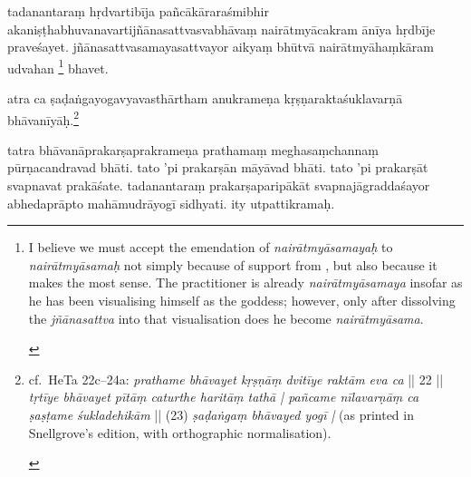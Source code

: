 \documentclass[naipra.tex]{subfiles}
\begin{document}
\begin{sanskrit}
\pstart
tadanantaraṃ hṛdvartibīja pañcākāraraśmibhir akaniṣṭhabhuvanavartijñānasattvasvabhāvaṃ nairātmyācakram ānīya hṛdbīje praveśayet.
jñānasattvasamayasattvayor aikyaṃ bhūtvā nairātmyāhaṃkāram udvahan \footnote{\begin{english}
	I believe we must accept the emendation of \emph{nairātmyāsamayaḥ} to \emph{nairātmyāsamaḥ} not simply because of support from \TIB , but also because it makes the most sense.
	The practitioner is already \emph{nairātmyāsamaya} insofar as he has been visualising himself as the goddess; however, only after dissolving the \emph{jñānasattva} into that visualisation does he become \emph{nairātmyāsama}.
\end{english}} bhavet. 
\pend


\pstart
atra ca ṣaḍaṅgayogavyavasthārtham anukrameṇa kṛṣṇaraktaśuklavarṇā bhāvanīyāḥ.\footnote{\begin{english}
	cf.\ HeTa 22c–24a: \emph{prathame bhāvayet kṛṣṇāṃ dvitīye raktām eva ca} || 22 || \emph{tṛtīye bhāvayet pītāṃ caturthe haritāṃ tathā | pañcame nīlavarṇāṃ ca ṣaṣṭame śukladehikām }|| (23) \emph{ṣaḍaṅgaṃ bhāvayed yogī |} (as printed in Snellgrove's edition, with orthographic normalisation).
\end{english}} 
\pend



\pstart
tatra bhāvanāprakarṣaprakrameṇa prathamaṃ meghasaṃchannaṃ pūrṇacandravad bhāti.
tato 'pi prakarṣān māyāvad bhāti.
tato 'pi prakarṣāt svapnavat prakāśate.
tadanantaraṃ prakarṣaparipākāt svapnajāgraddaśayor abhedaprāpto mahāmudrāyogī sidhyati.
ity utpattikramaḥ. 
\pend




\end{sanskrit}
\end{document}
